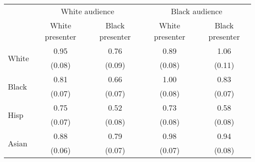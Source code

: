 \def\sym#1{\ifmmode^{#1}\else\(^{#1}\)\fi}
\begin{tabular}{l || c|c||c|c} 
 &\multicolumn{2}{c}{White audience}                                 &\multicolumn{2}{c}{Black audience}                          \\\cmidrule(lr){2-3}\cmidrule(lr){4-5}
& {White presenter} & {Black presenter} & {White  presenter} & {Black  presenter}\\
\toprule
\midrule
\multirow{2}{*}{White} & 0.95 & 0.76 & 0.89 & 1.06 \\
& (0.08) & (0.09) & (0.08) & (0.11) \\
\hline
\multirow{2}{*}{Black} & 0.81 & 0.66 & 1.00 & 0.83 \\
& (0.07) & (0.07) & (0.08) & (0.07) \\
\hline
\multirow{2}{*}{Hisp} & 0.75 & 0.52 & 0.73 & 0.58 \\
& (0.07) & (0.08) & (0.08) & (0.08) \\
\hline
\multirow{2}{*}{Asian} & 0.88 & 0.79 & 0.98 & 0.94 \\
& (0.06) & (0.07) & (0.07) & (0.08) \\
\hline
\bottomrule
\end{tabular}


